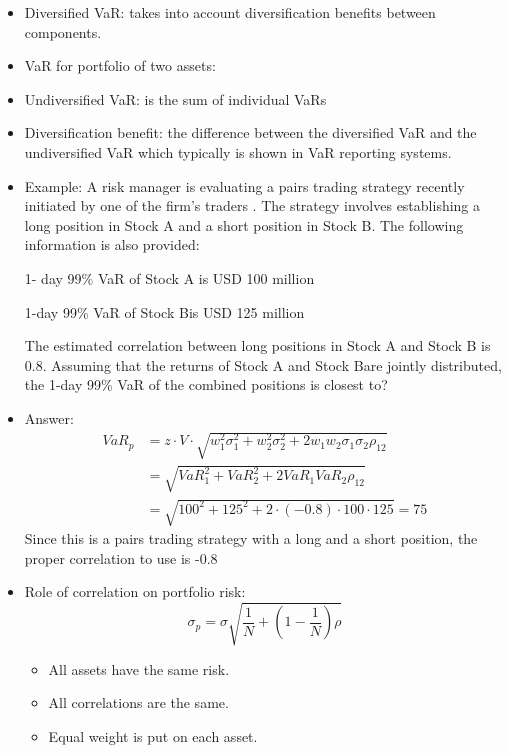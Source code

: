\begin{itemize}
\item Diversified VaR: takes into account diversification benefits between components.
\item VaR for portfolio of two assets:
\item Undiversified VaR: is the sum of individual VaRs
\item Diversification benefit: the difference between the diversified VaR and the undiversified VaR which typically is shown in VaR reporting systems.
\item Example: A risk manager is evaluating a pairs trading strategy recently initiated by one of the firm's traders . The strategy involves establishing a long position in Stock A and a short position in Stock B. The following information is also provided:

1- day 99\% VaR of Stock A is USD 100 million

1-day 99\% VaR of Stock Bis USD 125 million

The estimated correlation between long positions in Stock A and Stock B is 0.8. Assuming that the returns of Stock A and Stock Bare jointly distributed, the 1-day 99\% VaR of the combined positions is closest to?

\item Answer:
\begin{align*}
    VaR_p &= z \cdot V \cdot \sqrt{w_1^2 \sigma_1^2 + w_2^2 \sigma_2^2 + 2 w_1 w_2 \sigma_1 \sigma_2 \rho_{12}} \\
    &= \sqrt{VaR_1^2 + VaR_2^2 + 2 VaR_1 VaR_2 \rho_{12}} \\
    &= \sqrt{100^2 + 125^2 + 2 \cdot (-0.8) \cdot 100 \cdot 125} = 75
    \end{align*}
    Since this is a pairs trading strategy with a long and a short position, the proper correlation to use is -0.8
    

\item Role of correlation on portfolio risk:
\[
\sigma_p = \sigma \sqrt{\frac{1}{N} + \left(1 - \frac{1}{N}\right)\rho}
\]
    \begin{itemize}
    \item All assets have the same risk.
    \item All correlations are the same.
    \item Equal weight is put on each asset.
    \end{itemize}
\end{itemize}


